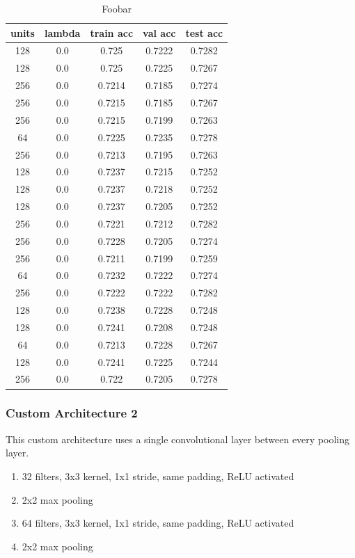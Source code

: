 \begin{table}[ht]
\centering \begin{tabular}{ |c|c|c|c|c| }
\hline
units & lambda & train acc & val acc & test acc \\
\hline
128 & 0.0 & 0.725 & 0.7222 & 0.7282 \\
128 & 0.0 & 0.725 & 0.7225 & 0.7267 \\
256 & 0.0 & 0.7214 & 0.7185 & 0.7274 \\
256 & 0.0 & 0.7215 & 0.7185 & 0.7267 \\
256 & 0.0 & 0.7215 & 0.7199 & 0.7263 \\
64 & 0.0 & 0.7225 & 0.7235 & 0.7278 \\
256 & 0.0 & 0.7213 & 0.7195 & 0.7263 \\
128 & 0.0 & 0.7237 & 0.7215 & 0.7252 \\
128 & 0.0 & 0.7237 & 0.7218 & 0.7252 \\
128 & 0.0 & 0.7237 & 0.7205 & 0.7252 \\
256 & 0.0 & 0.7221 & 0.7212 & 0.7282 \\
256 & 0.0 & 0.7228 & 0.7205 & 0.7274 \\
256 & 0.0 & 0.7211 & 0.7199 & 0.7259 \\
64 & 0.0 & 0.7232 & 0.7222 & 0.7274 \\
256 & 0.0 & 0.7222 & 0.7222 & 0.7282 \\
128 & 0.0 & 0.7238 & 0.7228 & 0.7248 \\
128 & 0.0 & 0.7241 & 0.7208 & 0.7248 \\
64 & 0.0 & 0.7213 & 0.7228 & 0.7267 \\
128 & 0.0 & 0.7241 & 0.7225 & 0.7244 \\
256 & 0.0 & 0.722 & 0.7205 & 0.7278 \\
\hline
\end{tabular}
\caption{Foobar}
\label{table:foobar}
\end{table}

\subsubsection{Custom Architecture 2}

This custom architecture uses a single convolutional layer between every pooling layer.

\begin{enumerate}
    \item 32 filters, 3x3 kernel, 1x1 stride, same padding, ReLU activated
    \item 2x2 max pooling
    \item 64 filters, 3x3 kernel, 1x1 stride, same padding, ReLU activated
    \item 2x2 max pooling
\end{enumerate}

